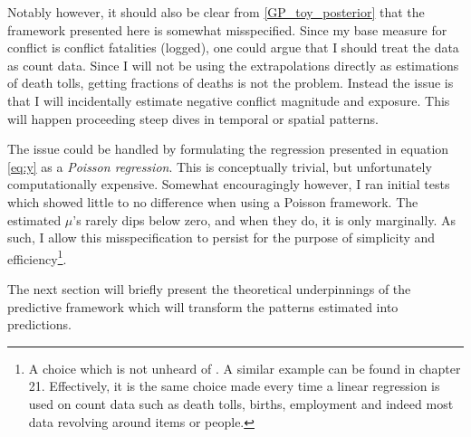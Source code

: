 \documentclass[a4paper]{article}
\begin{document}

Notably however, it should also be clear from \autoref{GP_toy_posterior} that the framework presented here is somewhat misspecified. Since my base measure for conflict is conflict fatalities (logged), one could argue that I should treat the data as count data. Since I will not be using the extrapolations directly as estimations of death tolls, getting fractions of deaths is not the problem. Instead the issue is that I will incidentally estimate negative conflict magnitude and exposure. This will happen proceeding steep dives in temporal or spatial patterns.\par

The issue could be handled by formulating the regression presented in equation \ref{eq:y} as a \emph{Poisson regression}. This is conceptually trivial, but unfortunately computationally expensive. Somewhat encouragingly however, I ran initial tests which showed little to no difference when using a Poisson framework. The estimated $\mu$'s rarely dips below zero, and when they do, it is only marginally. As such, I allow this misspecification to persist for the purpose of simplicity and efficiency\footnote{A choice which is not unheard of  \cite[123]{williams2006gaussian}. A similar example can be found in \cite{Gelman_2013} chapter 21. Effectively, it is the same choice made every time a linear regression is used on count data such as death tolls, births, employment and indeed most data revolving around items or people.}.\par %


The next section will briefly present the theoretical underpinnings of the predictive framework which will transform the patterns estimated into predictions.\par 

\end{document}
